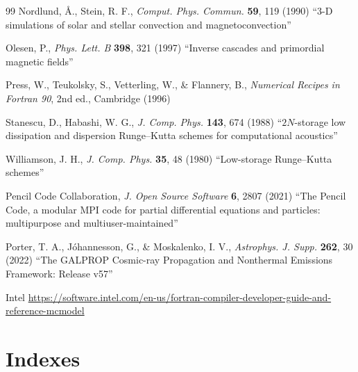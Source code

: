 \documentclass[\mydriver,12pt,twoside,notitlepage,a4paper]{article}
\begin{document}
\begin{thebibliography}{99}
 Nordlund, \AA., Stein, R. F.,
  \emph{Comput. Phys. Commun.} \textbf{59}, 119 (1990)
  ``3-D simulations of solar and stellar convection and magnetoconvection''

 Olesen, P., \emph{Phys. Lett. B} \textbf{398}, 321 (1997)
  ``Inverse cascades and primordial magnetic fields''

 Press, W., Teukolsky, S., Vetterling, W., \& Flannery, B.,
  \emph{Numerical Recipes in Fortran 90}, 2nd ed., Cambridge (1996)

 Stanescu, D., Habashi, W. G.,
  \emph{J. Comp. Phys.} \textbf{143}, 674 (1988)
  ``$2N$-storage low dissipation and dispersion Runge--Kutta
  schemes for computational acoustics''

 Williamson, J. H.,
  \emph{J. Comp. Phys.} \textbf{35}, 48 (1980)
  ``Low-storage Runge--Kutta schemes''

 Pencil Code Collaboration,
\emph{J. Open Source Software} \textbf{6}, 2807 (2021)
``The Pencil Code, a modular MPI code for partial differential
equations and particles: multipurpose and multiuser-maintained''

 Porter, T. A., J\'ohannesson, G., \& Moskalenko, I. V.,
  \emph{Astrophys. J. Supp.} \textbf{262}, 30 (2022)
``The GALPROP Cosmic-ray Propagation and Nonthermal Emissions Framework: Release v57''

 Intel \url{https://software.intel.com/en-us/fortran-compiler-developer-guide-and-reference-mcmodel}

\end{thebibliography}


\cleardoublepage

\part{Indexes}
\printindex[file]
\printindex[var]

\ \vfill\bigskip{}
\end{document}
